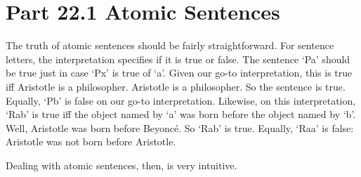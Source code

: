 \section{Part 22.1 Atomic Sentences}
The truth of atomic sentences should be fairly straightforward. For sentence letters, the interpretation specifies if it is true or false. The sentence ‘Pa’ should be true just in case ‘Px’ is true of ‘a’. Given our go-to interpretation, this is true iff Aristotle is a philosopher. Aristotle is a philosopher. So the sentence is true. Equally, ‘Pb’ is false on our go-to interpretation. Likewise, on this interpretation, ‘Rab’ is true iff the object named by ‘a’ was born before the object named by ‘b’. Well, Aristotle was born before Beyoncé. So ‘Rab’ is true. Equally, ‘Raa’ is false: Aristotle was not born before Aristotle.

Dealing with atomic sentences, then, is very intuitive. 
